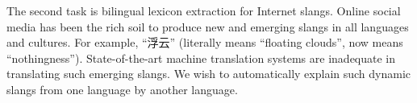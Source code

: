 The second task is bilingual lexicon extraction for Internet slangs. Online social media has been the rich soil to produce new and emerging slangs in 
all languages and cultures. 
For example, ``浮云'' (literally means ``floating clouds'', now means ``nothingness'').
State-of-the-art machine translation systems are inadequate in translating such emerging slangs.
We wish to automatically explain such dynamic slangs from one language by another language.



 
